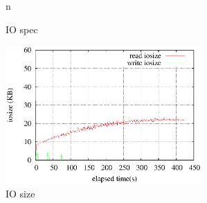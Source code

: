 \documentclass[11pt,a4paper]{jsarticle}
\newlength{\subfigwidth}
\newlength{\subfigcolsep}
\begin{document}
\begin{figure}[thbp]
 \setlength{\subfigwidth}{.5\linewidth}
 \addtolength{\subfigwidth}{-.5\subfigcolsep}
 \begin{minipage}[b]{\subfigwidth}
 \end{minipage}
  \begin{minipage}[b]{\subfigwidth}
  \end{minipage}
  \caption{IO spec}
n  \label{fig:1idxra2048}
\end{figure}

\begin{figure}[thbp]
 \begin{center}
  \includegraphics[width=75mm]{1idxscan_ra2048iosize.eps}
 \end{center}
 \caption{IO size}
 \label{fig:1idx2048iosize}
\end{figure}
\end{document}
